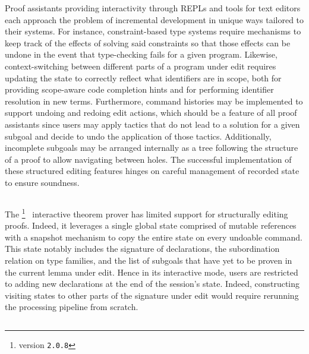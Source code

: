 
Proof assistants providing interactivity through \acp{REPL} and tools for text editors each approach the problem of incremental development in unique ways tailored to their systems.
For instance, constraint-based type systems require mechanisms to keep track of the effects of solving said constraints so that those effects can be undone in the event that type-checking fails for a given program.
Likewise, context-switching between different parts of a program under edit requires updating the state to correctly reflect what identifiers are in scope, both for providing scope-aware code completion hints and for performing identifier resolution in new terms.
Furthermore, command histories may be implemented to support undoing and redoing edit actions, which should be a feature of all proof assistants since users may apply tactics that do not lead to a solution for a given subgoal and decide to undo the application of those tactics.
Additionally, incomplete subgoals may be arranged internally as a tree following the structure of a proof to allow navigating between holes.
The successful implementation of these structured editing features hinges on careful management of recorded state to ensure soundness.

\subsection*{\Abella}

The \Abella\footnote{\Abella version \texttt{2.0.8}}~\cite{baelde2014abella} interactive theorem prover has limited support for structurally editing proofs.
Indeed, it leverages a single global state comprised of mutable references with a snapshot mechanism to copy the entire state on every undoable command.
This state notably includes the signature of declarations, the subordination relation on type families, and the list of subgoals that have yet to be proven in the current lemma under edit.
Hence in its interactive mode, \Abella users are restricted to adding new declarations at the end of the session's state.
Indeed, constructing visiting states to other parts of the signature under edit would require rerunning the processing pipeline from scratch.

\subsection*{\Isabelle}

